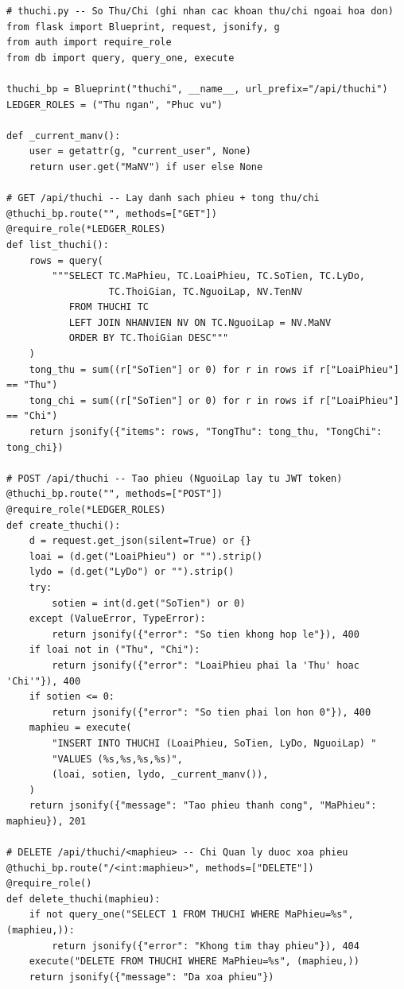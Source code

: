 \documentclass[12pt,a4paper]{report}
\begin{document}
\begin{lstlisting}[style=mypython,
  caption={File \texttt{thuchi.py} -- Sổ thu/chi: tạo, liệt kê và xóa phiếu},
  label=lst:python-thuchi]
# thuchi.py -- So Thu/Chi (ghi nhan cac khoan thu/chi ngoai hoa don)
from flask import Blueprint, request, jsonify, g
from auth import require_role
from db import query, query_one, execute

thuchi_bp = Blueprint("thuchi", __name__, url_prefix="/api/thuchi")
LEDGER_ROLES = ("Thu ngan", "Phuc vu")

def _current_manv():
    user = getattr(g, "current_user", None)
    return user.get("MaNV") if user else None

# GET /api/thuchi -- Lay danh sach phieu + tong thu/chi
@thuchi_bp.route("", methods=["GET"])
@require_role(*LEDGER_ROLES)
def list_thuchi():
    rows = query(
        """SELECT TC.MaPhieu, TC.LoaiPhieu, TC.SoTien, TC.LyDo,
                  TC.ThoiGian, TC.NguoiLap, NV.TenNV
           FROM THUCHI TC
           LEFT JOIN NHANVIEN NV ON TC.NguoiLap = NV.MaNV
           ORDER BY TC.ThoiGian DESC"""
    )
    tong_thu = sum((r["SoTien"] or 0) for r in rows if r["LoaiPhieu"] == "Thu")
    tong_chi = sum((r["SoTien"] or 0) for r in rows if r["LoaiPhieu"] == "Chi")
    return jsonify({"items": rows, "TongThu": tong_thu, "TongChi": tong_chi})

# POST /api/thuchi -- Tao phieu (NguoiLap lay tu JWT token)
@thuchi_bp.route("", methods=["POST"])
@require_role(*LEDGER_ROLES)
def create_thuchi():
    d = request.get_json(silent=True) or {}
    loai = (d.get("LoaiPhieu") or "").strip()
    lydo = (d.get("LyDo") or "").strip()
    try:
        sotien = int(d.get("SoTien") or 0)
    except (ValueError, TypeError):
        return jsonify({"error": "So tien khong hop le"}), 400
    if loai not in ("Thu", "Chi"):
        return jsonify({"error": "LoaiPhieu phai la 'Thu' hoac 'Chi'"}), 400
    if sotien <= 0:
        return jsonify({"error": "So tien phai lon hon 0"}), 400
    maphieu = execute(
        "INSERT INTO THUCHI (LoaiPhieu, SoTien, LyDo, NguoiLap) "
        "VALUES (%s,%s,%s,%s)",
        (loai, sotien, lydo, _current_manv()),
    )
    return jsonify({"message": "Tao phieu thanh cong", "MaPhieu": maphieu}), 201

# DELETE /api/thuchi/<maphieu> -- Chi Quan ly duoc xoa phieu
@thuchi_bp.route("/<int:maphieu>", methods=["DELETE"])
@require_role()
def delete_thuchi(maphieu):
    if not query_one("SELECT 1 FROM THUCHI WHERE MaPhieu=%s", (maphieu,)):
        return jsonify({"error": "Khong tim thay phieu"}), 404
    execute("DELETE FROM THUCHI WHERE MaPhieu=%s", (maphieu,))
    return jsonify({"message": "Da xoa phieu"})
\end{lstlisting}
\end{document}
